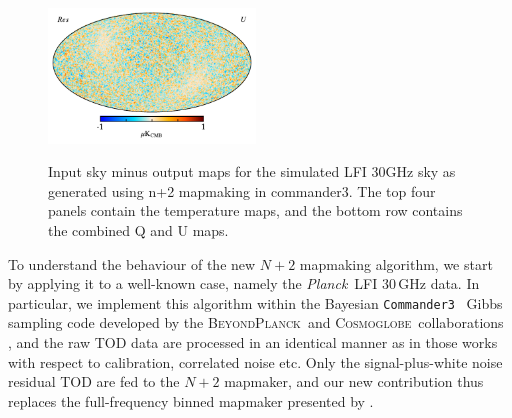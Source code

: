 \documentclass{aa}
\def\commanderthree{\texttt{Commander3}}
\newcommand{\BP}{\textsc{BeyondPlanck}}
\newcommand{\cosmoglobe}{\textsc{Cosmoglobe}}
\def\Planck{\textit{Planck}}
\begin{document}
\begin{figure}
  \includegraphics[width=0.49\textwidth]{figs/sim_diff_U.pdf}\\
  \caption{Input sky minus output maps for the simulated LFI 30GHz sky as generated using n+2 mapmaking in commander3. The top four panels contain the temperature maps, and the bottom row contains the combined Q and U maps.}
  \label{fig:sim_diff}
\end{figure}








To understand the behaviour of the new $N+2$ mapmaking algorithm, we start by applying it to a well-known case, namely the \Planck\ LFI 30\,GHz data. In particular, we implement this algorithm within the Bayesian \commanderthree\ \citep{bp03} Gibbs sampling code developed by the \BP\ and \cosmoglobe\ collaborations \citep{bp01, watts2023_dr1}, and the raw TOD data are processed in an identical manner as in those works with respect to calibration, correlated noise etc. Only the signal-plus-white noise residual TOD are fed to the $N+2$ mapmaker, and our new contribution thus replaces the full-frequency binned mapmaker presented by \citet{BP10}. 
\end{document}
